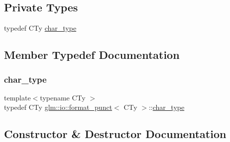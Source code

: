 \subsection*{Private Types}
\begin{DoxyCompactItemize}
\item 
typedef C\+Ty \hyperlink{classglm_1_1io_1_1format__punct_ae94c42484a4c5258ad7b2f0f029efdf3}{char\+\_\+type}
\end{DoxyCompactItemize}


\subsection{Member Typedef Documentation}
\mbox{\label{classglm_1_1io_1_1format__punct_ae94c42484a4c5258ad7b2f0f029efdf3}} 
\subsubsection{\texorpdfstring{char\+\_\+type}{char\_type}}
{\footnotesize\ttfamily template$<$typename C\+Ty $>$ \\
typedef C\+Ty \hyperlink{classglm_1_1io_1_1format__punct}{glm\+::io\+::format\+\_\+punct}$<$ C\+Ty $>$\+::\hyperlink{classglm_1_1io_1_1format__punct_ae94c42484a4c5258ad7b2f0f029efdf3}{char\+\_\+type}\hspace{0.3cm}{\ttfamily [private]}}



\subsection{Constructor \& Destructor Documentation}
\mbox{\label{classglm_1_1io_1_1format__punct_ae56e7a14fac2516658837281b9da4659}} 
